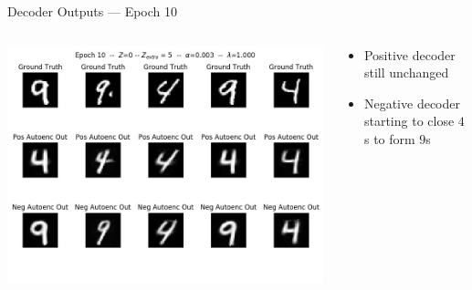 \documentclass[11pt,dvipsnames,usenames,aspectratio=169]{beamer}  %
\newcommand{\blue}[1]{{\color{Blue} #1}}
\newcommand{\red}[1]{{\color{red} #1}}
\begin{document}
\begin{frame}{Decoder Outputs --- Epoch \red{10}}
  \begin{columns}
    \begin{column}{0.59\textwidth}
      \begin{center}
        \includegraphics[scale=0.44]{deep-pu_epoch=010.jpg}
      \end{center}
    \end{column}
    \begin{column}{0.41\textwidth}
      \begin{itemize}[<+->]
        \setlength{\itemsep}{20pt}
        \item Positive decoder still unchanged
        \item Negative decoder starting to close \blue{$4$}s to form \red{$9$}s
      \end{itemize}
    \end{column}
  \end{columns}
\end{frame}
\end{document}
